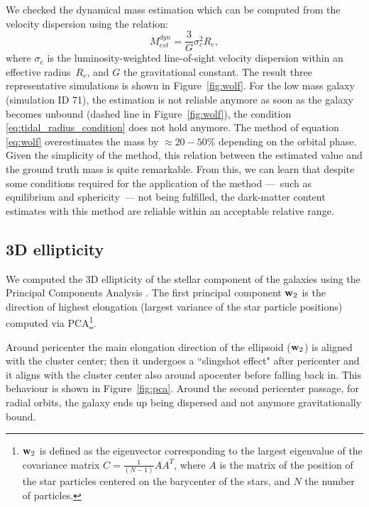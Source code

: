 We checked the dynamical mass estimation which can be computed from the velocity dispersion using the \citet{Wolf2010} relation:
\begin{equation}
\label{eq:wolf}
M^{dyn}_{est} = \dfrac{3}{G} \sigma_e^2 R_e,
\end{equation}
where $\sigma_e$ is the luminosity-weighted line-of-sight velocity dispersion within an effective radius~$R_e$,
and $G$ the gravitational constant.
The result three representative simulations is shown in Figure~\ref{fig:wolf}.
For the low mass galaxy (simulation ID 71), the estimation is not reliable anymore as soon as the galaxy becomes unbound (dashed line in Figure~\ref{fig:wolf}), \ie{} the condition \eqref{eq:tidal_radius_condition} does not hold anymore.
The method of equation \eqref{eq:wolf} overestimates the mass by $\approx20-50\%$ depending on the orbital phase.
Given the simplicity of the method, this relation between the estimated value and the ground truth mass is quite remarkable.
From this, we can learn that despite some conditions required for the application of the method ---~such as equilibrium and sphericity~--- not being fulfilled, the dark-matter content estimates with this method are reliable within an acceptable relative range.



\subsection{3D ellipticity} \label{sec:3d_ellipticity}
We computed the 3D ellipticity of the stellar component of the galaxies using the Principal Components Analysis \citep[PCA, ][]{Pearson1901}.
The first principal component $\boldsymbol{\mathbf{w}}_2$ is the direction of highest elongation (largest variance of the star particle positions) computed via PCA\footnote{
$\boldsymbol{\mathbf{w}}_2$ is defined as the eigenvector corresponding to the largest eigenvalue of the covariance matrix $C = \frac 1 {(N-1)} AA^T$, where $A$ is the matrix of the position of the star particles centered on the barycenter of the stars, and $N$ the number of particles.}.

Around pericenter the main elongation direction of the ellipsoid ($\boldsymbol{\mathbf{w}}_2$) is aligned with the cluster center; then it undergoes a ``slingshot effect" after pericenter and it aligns with the cluster center also around apocenter before falling back in. This behaviour is shown in Figure~\ref{fig:pca}.
Around the second pericenter passage, for radial orbits, the galaxy ends up being dispersed and not anymore gravitationally bound.

